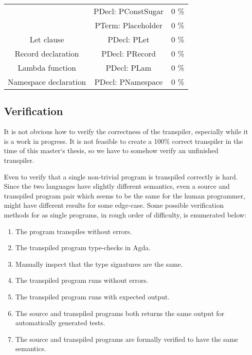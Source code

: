 \documentclass[parskip=half]{scrartcl}
\begin{document}
\begin{center}
\begin{tabular}{ c c c }
                           & PDecl: PConstSugar      & 0 \% \\
                           & PTerm: Placeholder      & 0 \% \\
    Let clause             & PDecl: PLet             & 0 \% \\
    Record declaration     & PDecl: PRecord          & 0 \% \\
    Lambda function        & PDecl: PLam             & 0 \% \\
    Namespace declaration  & PDecl: PNamespace       & 0 \% \\
  \end{tabular}
\end{center}




\subsection{Verification}
It is not obvious how to verify the correctness of the transpiler, especially
while it is a work in progress. It is not feasible to create a 100\% correct
transpiler in the time of this master`s thesis, so we have to somehow verify an
unfinished transpiler.

Even to verify that a single non-trivial program is transpiled correctly is
hard. Since the two languages have slightly different semantics, even a source
and transpiled program pair which seems to be the same for the human
programmer, might have different results for some edge-case. Some possible
verification methods for as single programs, in rough order of difficulty, is
enumerated below:

\begin{enumerate}
\item The program transpiles without errors.
\item The transpiled program type-checks in Agda.
\item Manually inspect that the type signatures are the same.
\item The transpiled program runs without errors.
\item The transpiled program runs with expected output.
\item The source and transpiled programs both returns the same output for
  automatically generated tests.
\item The source and transpiled programs are formally verified to have the same
  semantics.
\end{enumerate}
\end{document}
